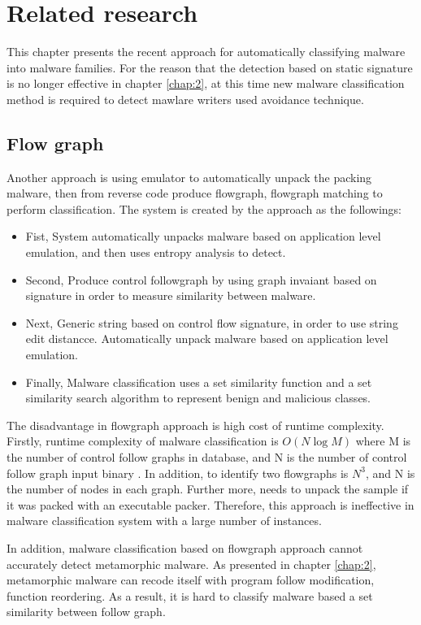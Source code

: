 \chapter{Related research}\label{chap:3}
%
%
This chapter presents the recent approach for automatically classifying malware into malware families. For the reason that the detection based on static signature is no longer effective in chapter \ref{chap:2}, at this time new malware classification method is required to detect mawlare writers used avoidance technique.

\section{Flow graph}
Another approach is using emulator to automatically unpack the packing malware, then from reverse code produce flowgraph, flowgraph matching to perform classification\cite{silvio}. The system is created by the approach as the followings:

\begin{itemize}
\item Fist, System automatically unpacks malware based on application level emulation, and then uses entropy analysis to detect.
\item Second, Produce control followgraph by using graph invaiant based on signature in order to measure similarity between malware.
\item Next, Generic string based on control flow signature, in order to use string edit distancce. Automatically unpack malware based on application level emulation.
\item Finally, Malware classification uses a set similarity function and a set similarity search algorithm to represent benign and malicious classes.
\end{itemize}

The disadvantage in flowgraph approach is high cost of runtime complexity. Firstly, runtime complexity of malware classification is $O(N\log{M})$ where M is the number of control follow graphs in database, and N is the number of control follow graph input binary \cite{silvio}. In addition, to identify two flowgraphs is $N^{3}$, and N is the number of nodes in each graph. Further more, needs to unpack the sample if it was packed with an executable packer. Therefore, this approach is ineffective in malware classification system with a large number of instances.

In addition, malware classification based on flowgraph approach cannot accurately detect metamorphic malware. As presented in chapter \ref{chap:2}, metamorphic malware can recode itself with program follow modification, function reordering. As a result, it is hard to classify malware based a set  similarity between follow graph.
